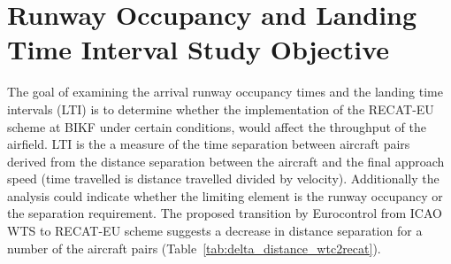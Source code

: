 \section{Runway Occupancy and Landing Time Interval Study Objective}\label{sec:study_objective}
The goal of examining the arrival runway occupancy times and the landing time intervals (LTI) is to determine whether the implementation of the RECAT-EU scheme at BIKF under certain conditions, would affect the throughput of the airfield. 
LTI is the a measure of the time separation between aircraft pairs derived from the distance separation between the aircraft and the final approach speed (time travelled is distance travelled divided by velocity).
Additionally the analysis could indicate whether the limiting element is the runway occupancy or the separation requirement. The proposed transition by Eurocontrol from ICAO WTS to RECAT-EU scheme suggests a decrease in distance separation for a number of the aircraft pairs (Table~\ref{tab:delta_distance_wtc2recat}).

